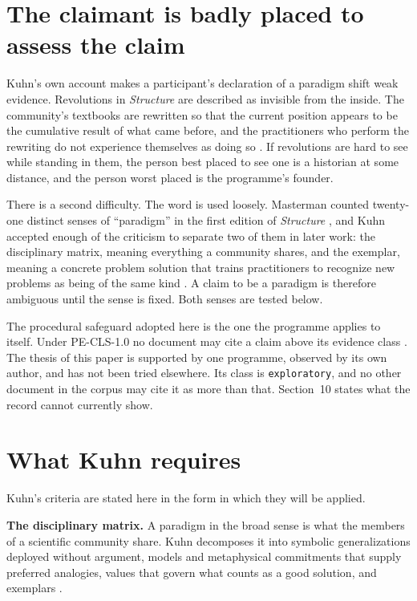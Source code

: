 \documentclass[11pt,letterpaper]{article}
\begin{document}
\section{The claimant is badly placed to assess the claim}

Kuhn's own account makes a participant's declaration of a paradigm shift weak
evidence. Revolutions in \emph{Structure} are described as invisible from the
inside. The community's textbooks are rewritten so that the current position
appears to be the cumulative result of what came before, and the practitioners
who perform the rewriting do not experience themselves as doing so
\citep[ch.~11]{kuhn1970}. If revolutions are hard to see while standing in them,
the person best placed to see one is a historian at some distance, and the person
worst placed is the programme's founder.

There is a second difficulty. The word is used loosely. Masterman counted
twenty-one distinct senses of ``paradigm'' in the first edition of
\emph{Structure} \citep{masterman1970}, and Kuhn accepted enough of the criticism
to separate two of them in later work: the disciplinary matrix, meaning
everything a community shares, and the exemplar, meaning a concrete problem
solution that trains practitioners to recognize new problems as being of the same
kind \citep{kuhn1974}. A claim to be a paradigm is therefore ambiguous until the
sense is fixed. Both senses are tested below.

The procedural safeguard adopted here is the one the programme applies to
itself. Under PE-CLS-1.0 no document may cite a claim above its evidence class
\citep{pecls}. The thesis of this paper is supported by one programme, observed
by its own author, and has not been tried elsewhere. Its class is
\texttt{exploratory}, and no other document in the corpus may cite it as more
than that. Section~10 states what the record cannot currently show.

\section{What Kuhn requires}

Kuhn's criteria are stated here in the form in which they will be applied.

\textbf{The disciplinary matrix.} A paradigm in the broad sense is what the
members of a scientific community share. Kuhn decomposes it into symbolic
generalizations deployed without argument, models and metaphysical commitments
that supply preferred analogies, values that govern what counts as a good
solution, and exemplars \citep[Postscript]{kuhn1970}.
\end{document}
